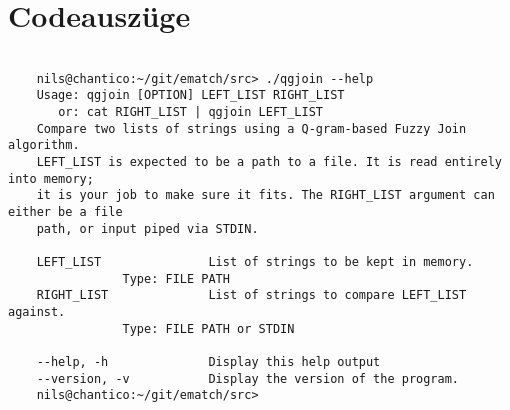 \section{Codeauszüge}
\label{sec:codeAuszüge}



\clearpage




\begin{lstlisting}[style=xterm, caption=Ausgabe der Endnutzerdokumentation über den --help parameter, label=fig:cliHelp,]

	nils@chantico:~/git/ematch/src> ./qgjoin --help
	Usage: qgjoin [OPTION] LEFT_LIST RIGHT_LIST
	   or: cat RIGHT_LIST | qgjoin LEFT_LIST
	Compare two lists of strings using a Q-gram-based Fuzzy Join algorithm.
	LEFT_LIST is expected to be a path to a file. It is read entirely into memory;
	it is your job to make sure it fits. The RIGHT_LIST argument can either be a file
	path, or input piped via STDIN.
	
	LEFT_LIST               List of strings to be kept in memory.
				Type: FILE PATH
	RIGHT_LIST              List of strings to compare LEFT_LIST against.
				Type: FILE PATH or STDIN
	
	--help, -h              Display this help output
	--version, -v           Display the version of the program.
	nils@chantico:~/git/ematch/src>

\end{lstlisting}


